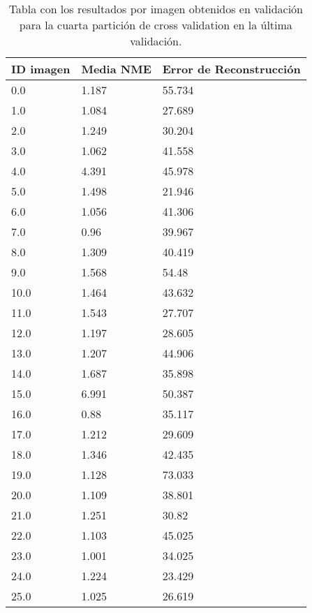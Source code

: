 \begin{table}[!ht]
    \centering
    \caption{Tabla con los resultados por imagen obtenidos en validación para la cuarta partición de cross validation en la última validación.}
    \begin{tabular}{|l|l|l|}
    \hline
        ID imagen & Media NME & Error de Reconstrucción \\ \hline
        0.0 & 1.187 & 55.734 \\ \hline
        1.0 & 1.084 & 27.689 \\ \hline
        2.0 & 1.249 & 30.204 \\ \hline
        3.0 & 1.062 & 41.558 \\ \hline
        4.0 & 4.391 & 45.978 \\ \hline
        5.0 & 1.498 & 21.946 \\ \hline
        6.0 & 1.056 & 41.306 \\ \hline
        7.0 & 0.96 & 39.967 \\ \hline
        8.0 & 1.309 & 40.419 \\ \hline
        9.0 & 1.568 & 54.48 \\ \hline
        10.0 & 1.464 & 43.632 \\ \hline
        11.0 & 1.543 & 27.707 \\ \hline
        12.0 & 1.197 & 28.605 \\ \hline
        13.0 & 1.207 & 44.906 \\ \hline
        14.0 & 1.687 & 35.898 \\ \hline
        15.0 & 6.991 & 50.387 \\ \hline
        16.0 & 0.88 & 35.117 \\ \hline
        17.0 & 1.212 & 29.609 \\ \hline
        18.0 & 1.346 & 42.435 \\ \hline
        19.0 & 1.128 & 73.033 \\ \hline
        20.0 & 1.109 & 38.801 \\ \hline
        21.0 & 1.251 & 30.82 \\ \hline
        22.0 & 1.103 & 45.025 \\ \hline
        23.0 & 1.001 & 34.025 \\ \hline
        24.0 & 1.224 & 23.429 \\ \hline
        25.0 & 1.025 & 26.619 \\ \hline
    \end{tabular}
    \label{table:Daugmentation_images_4}
\end{table}

